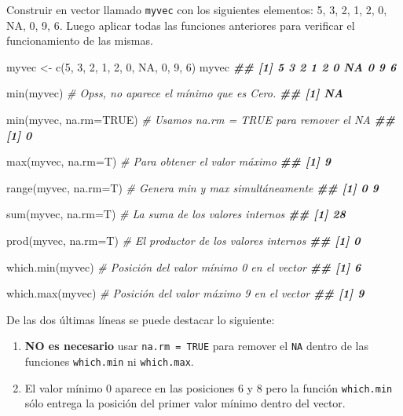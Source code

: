 \documentclass[
]{book}
\newenvironment{Shaded}{\begin{snugshade}}{\end{snugshade}}
\newcommand{\AttributeTok}[1]{\textcolor[rgb]{0.77,0.63,0.00}{#1}}
\newcommand{\CommentTok}[1]{\textcolor[rgb]{0.56,0.35,0.01}{\textit{#1}}}
\newcommand{\ConstantTok}[1]{\textcolor[rgb]{0.00,0.00,0.00}{#1}}
\newcommand{\DecValTok}[1]{\textcolor[rgb]{0.00,0.00,0.81}{#1}}
\newcommand{\DocumentationTok}[1]{\textcolor[rgb]{0.56,0.35,0.01}{\textbf{\textit{#1}}}}
\newcommand{\FunctionTok}[1]{\textcolor[rgb]{0.00,0.00,0.00}{#1}}
\newcommand{\NormalTok}[1]{#1}
\newcommand{\OtherTok}[1]{\textcolor[rgb]{0.56,0.35,0.01}{#1}}
\providecommand{\tightlist}{%
  \setlength{\itemsep}{0pt}\setlength{\parskip}{0pt}}
\begin{document}
Construir en vector llamado \texttt{myvec} con los siguientes elementos: 5, 3, 2, 1, 2, 0, NA, 0, 9, 6. Luego aplicar todas las funciones anteriores para verificar el funcionamiento de las mismas.

\begin{Shaded}
\begin{Highlighting}[]
\NormalTok{myvec }\OtherTok{\textless{}{-}} \FunctionTok{c}\NormalTok{(}\DecValTok{5}\NormalTok{, }\DecValTok{3}\NormalTok{, }\DecValTok{2}\NormalTok{, }\DecValTok{1}\NormalTok{, }\DecValTok{2}\NormalTok{, }\DecValTok{0}\NormalTok{, }\ConstantTok{NA}\NormalTok{, }\DecValTok{0}\NormalTok{, }\DecValTok{9}\NormalTok{, }\DecValTok{6}\NormalTok{)}
\NormalTok{myvec}
\DocumentationTok{\#\#  [1]  5  3  2  1  2  0 NA  0  9  6}

\FunctionTok{min}\NormalTok{(myvec)  }\CommentTok{\# Opss, no aparece el mínimo que es Cero.}
\DocumentationTok{\#\# [1] NA}

\FunctionTok{min}\NormalTok{(myvec, }\AttributeTok{na.rm=}\ConstantTok{TRUE}\NormalTok{)  }\CommentTok{\# Usamos na.rm = TRUE para remover el NA}
\DocumentationTok{\#\# [1] 0}

\FunctionTok{max}\NormalTok{(myvec, }\AttributeTok{na.rm=}\NormalTok{T)  }\CommentTok{\# Para obtener el valor máximo}
\DocumentationTok{\#\# [1] 9}

\FunctionTok{range}\NormalTok{(myvec, }\AttributeTok{na.rm=}\NormalTok{T)  }\CommentTok{\# Genera min y max simultáneamente}
\DocumentationTok{\#\# [1] 0 9}

\FunctionTok{sum}\NormalTok{(myvec, }\AttributeTok{na.rm=}\NormalTok{T)  }\CommentTok{\# La suma de los valores internos}
\DocumentationTok{\#\# [1] 28}

\FunctionTok{prod}\NormalTok{(myvec, }\AttributeTok{na.rm=}\NormalTok{T)  }\CommentTok{\# El productor de los valores internos}
\DocumentationTok{\#\# [1] 0}

\FunctionTok{which.min}\NormalTok{(myvec)  }\CommentTok{\# Posición del valor mínimo 0 en el vector}
\DocumentationTok{\#\# [1] 6}

\FunctionTok{which.max}\NormalTok{(myvec)  }\CommentTok{\# Posición del valor máximo 9 en el vector}
\DocumentationTok{\#\# [1] 9}
\end{Highlighting}
\end{Shaded}

De las dos últimas líneas se puede destacar lo siguiente:

\begin{enumerate}
\def\labelenumi{\arabic{enumi}.}
\tightlist
\item
  \textbf{NO es necesario} usar \texttt{na.rm\ =\ TRUE} para remover el \texttt{NA} dentro de las funciones \texttt{which.min} ni \texttt{which.max}.
\item
  El valor mínimo 0 aparece en las posiciones 6 y 8 pero la función \texttt{which.min} sólo entrega la posición del primer valor mínimo dentro del vector.
\end{enumerate}
\end{document}
